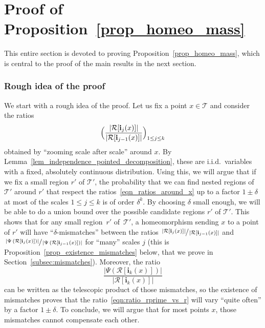 \documentclass[JEP,XML,SOM,Unicode,NoFloatCountersInSection,published]{cedram}
\newcommand{\Tt}{\mathcal{T}}
\newcommand{\Rr}{\mathcal{R}}
\newcommand{\ii}{\mathbf{i}}
\newcommand{\ikx}{\ii_k(x)}
\newcommand{\ijx}{\ii_j(x)}
\theoremstyle{plain}
\theoremstyle{definition}
\begin{document}
\section{Proof of Proposition~\ref{prop_homeo_mass}} \label{sec:proof of prop homeo mass}
This entire section is devoted to proving Proposition~\ref{prop_homeo_mass}, which is central to the proof of the main results in the next section.

\subsubsection*{Rough idea of the proof}
We start with a rough idea of the proof.
Let us fix a point $x \in \Tt$ and consider the ratios
\begin{equation}\label{eqn_ratios_around_x}
\Bigl( \frac{\left| \Rr[\ijx] \right|}{\left| \Rr[\ii_{j-1}(x)] \right|} \Bigr)_{1 \leq j \leq k}
\end{equation}
obtained by ``zooming scale after scale'' around $x$. By Lemma~\ref{lem_independence_pointed_decomposition}, these are i.i.d.\ variables with a fixed, absolutely continuous distribution.
Using this, we will argue that if we fix a small region $r'$ of $\Tt'$, the probability that we can find nested regions of~$\Tt'$ around $r'$ that respect the ratios~\eqref{eqn_ratios_around_x} up to a factor $1\pm\delta$ at most of the scales $1 \leq j \leq k$ is of order $\delta^k$.
By choosing $\delta$ small enough, we will be able to do a union bound over the possible candidate regions $r'$ of $\Tt'$.
This shows that for any small region~$r'$ of~$\mathcal{T}'$, a homeomorphism sending $x$ to a point of $r'$ will have ``$\delta$-mismatches'' between the ratios $\sfrac{\left| \Rr[\ijx] \right|}{\left| \Rr[\ii_{j-1}(x)] \right|}$ and $\sfrac{\left| \Psi \left( \Rr[\ijx] \right) \right|}{\left| \Psi \left( \Rr[\ii_{j-1}(x)] \right) \right|}$ for ``many'' scales $j$ (this is Proposition~\ref{prop_existence_mismatches} below, that we prove in Section~\ref{subsec:mismatches}).
Moreover, the ratio
\begin{equation}\label{eqn:ratio_rprime_vs_r}
\frac{\left| \Psi \left( \Rr[\ikx] \right) \right|}{\left| \Rr[\ikx] \right|}
\end{equation}
can be written as the telescopic product of those mismatches, so the existence of mismatches proves that the ratio~\eqref{eqn:ratio_rprime_vs_r} will vary ``quite often'' by a factor $1\pm\delta$.
To conclude, we will argue that for most points $x$, those mismatches cannot compensate each other.
\end{document}
